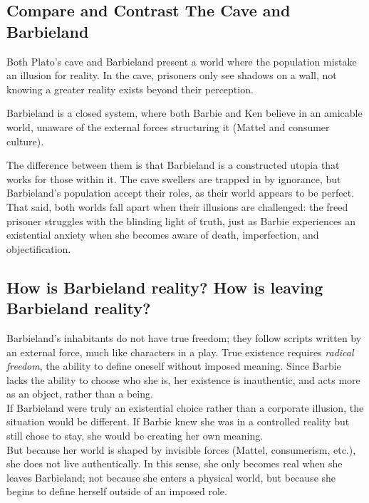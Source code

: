 
\subsection{Compare and Contrast The Cave and Barbieland}

Both Plato's cave and Barbieland present a world where the population
mistake an illusion for reality. In the cave, prisoners only see shadows on a wall,
not knowing a greater reality exists beyond their perception.

Barbieland is a closed system, where both Barbie and Ken believe in an 
amicable world, unaware of the external forces structuring it (Mattel and consumer culture).

The difference between them is that Barbieland is a constructed utopia that works for those within it.
The cave swellers are trapped in by ignorance, but Barbieland's population accept their roles, as their world 
appears to be perfect. \\

That said, both worlds fall apart when their illusions are challenged: the freed prisoner struggles with
the blinding light of truth, just as Barbie experiences an existential anxiety when she becomes aware of death,
imperfection, and objectification. \\

\subsection{How is Barbieland reality? How is leaving Barbieland reality?}

Barbieland’s inhabitants do not have true freedom; they follow scripts 
written by an external force, much like characters in a play. 
True existence requires \textit{radical freedom}, the ability to define oneself 
without imposed meaning. Since Barbie lacks the ability to choose who she is, 
her existence is inauthentic, and acts more as an object, rather than a being. \\ 

If Barbieland were truly an existential choice rather than a corporate illusion, 
the situation would be different. If Barbie knew she was in a controlled reality 
but still chose to stay, she would be creating her own meaning. \\ 

But because her world is shaped by invisible forces (Mattel, consumerism, etc.), 
she does not live authentically. In this sense, she only becomes real when she 
leaves Barbieland; not because she enters a physical world, but because she 
begins to define herself outside of an imposed role. \\ 

